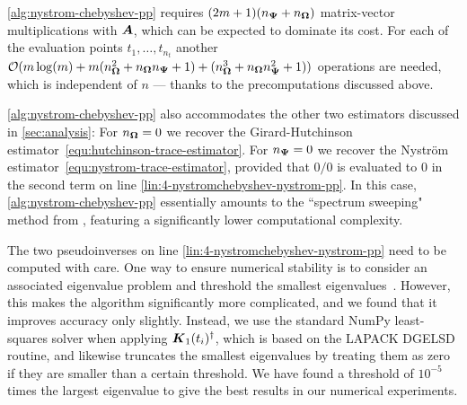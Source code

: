 
\cref{alg:nystrom-chebyshev-pp} requires $(2m + 1)(n_{\boldsymbol{\Psi}} + n_{\boldsymbol{\Omega}})$ matrix-vector multiplications with $\boldsymbol{A}$, which can be expected to dominate its cost. For each of the evaluation points $t_1, \dots, t_{n_t}$ another $\mathcal{O}(m \log(m) + m (n_{\boldsymbol{\Omega}}^2 + n_{\boldsymbol{\Omega}} n_{\boldsymbol{\Psi}} + 1) + (n_{\boldsymbol{\Omega}}^3 + n_{\boldsymbol{\Omega}} n_{\boldsymbol{\Psi}}^2 + 1))$ operations are needed, which is independent of $n$ --- thanks to the precomputations discussed above.

\cref{alg:nystrom-chebyshev-pp} also accommodates the other two estimators discussed in \cref{sec:analysis}: For $n_{\boldsymbol{\Omega}} = 0$ we recover the Girard-Hutchinson estimator~\cref{equ:hutchinson-trace-estimator}. For $n_{\boldsymbol{\Psi}} = 0$ we recover the Nyström estimator~\cref{equ:nystrom-trace-estimator}, provided that $0/0$ is evaluated to $0$ in the second term on line \ref{lin:4-nystromchebyshev-nystrom-pp}. In this case, \cref{alg:nystrom-chebyshev-pp} essentially amounts to the ``spectrum sweeping" method from \cite[Algorithm 5]{lin-2017-randomized-estimation}, featuring a significantly lower computational complexity.

The two pseudoinverses on line \ref{lin:4-nystromchebyshev-nystrom-pp} need to be computed with care. One way to ensure numerical stability is to 
consider an associated eigenvalue problem and threshold the smallest eigenvalues~\cite{lin-2017-randomized-estimation, epperly-2022-theory-quantum}. However, this makes the algorithm significantly more complicated, and we found that it improves accuracy only slightly. Instead, we use the standard NumPy least-squares solver when applying $\boldsymbol{K}_1(t_i)^{\dagger}$, which is based on the LAPACK DGELSD routine, and likewise truncates the smallest eigenvalues by treating them as zero if they are smaller than a certain threshold. We have found a threshold of $10^{-5}$ times the largest eigenvalue to give the best results in our numerical experiments. 

